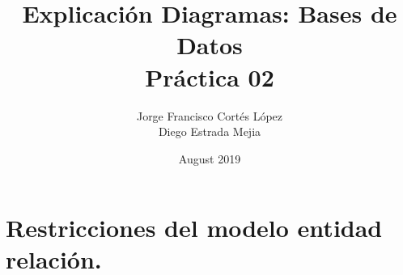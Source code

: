\documentclass{article}
\title{Explicación Diagramas: Bases de Datos\\
Práctica 02}
\author{Jorge Francisco Cortés López\\
Diego Estrada Mejia}
\date{August 2019}
\begin{document}
\maketitle

\section{Restricciones del modelo entidad relación.}
\end{document}

